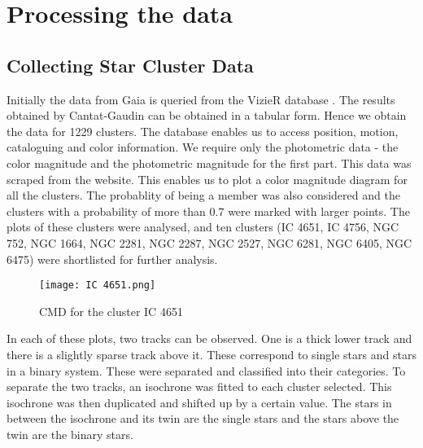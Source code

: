 \chapter{Processing the data}\label{ch:ch2}

\section{Collecting Star Cluster Data}
Initially the data from Gaia is queried from the VizieR database \citep{vizier}. The results obtained by Cantat-Gaudin \citep{cg} can be obtained in a tabular form. Hence we obtain the data for 1229 clusters. The database enables us to access position, motion, cataloguing and color information. We require only the photometric data - the color magnitude and the photometric magnitude for the first part. This data was scraped from the website. This enables us to plot a color magnitude diagram for all the clusters. The probablity of being a member was also considered and the clusters with a probability of more than $0.7$ were marked with larger points. The plots of these clusters were analysed, and ten clusters (IC 4651, IC 4756, NGC 752, NGC 1664, NGC 2281, NGC 2287, NGC 2527, NGC 6281, NGC 6405, NGC 6475) were shortlisted for further analysis.

\begin{figure}[h]
	\centering
	\texttt{[image: IC 4651.png]}
	\caption{CMD for the cluster IC 4651}
	\label{fig:im2}
\end{figure}

In each of these plots, two tracks can be observed. One is a thick lower track and there is a slightly sparse track above it. These correspond to single stars and stars in a binary system. These were separated and classified into their categories. To separate the two tracks, an isochrone was fitted to each cluster selected. This isochrone was then duplicated and shifted up by a certain value. The stars in between the isochrone and its twin are the single stars and the stars above the twin are the binary stars.

